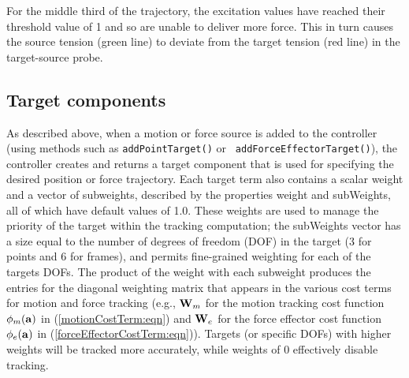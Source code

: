 For the middle third of the trajectory, the excitation values have reached
their threshold value of 1 and so are unable to deliver more force. This in
turn causes the source tension (green line) to deviate from the target tension
(red line) in the target-source probe.

%

\subsection{Target components}
\label{TargetComponents:sec}

As described above, when a motion or force source is added to the controller
(using methods such as {\tt addPointTarget()} or {\tt
addForceEffectorTarget()}), the controller creates and returns a target
component that is used for specifying the desired position or force
trajectory. Each target term also contains a scalar weight and a vector of
subweights, described by the properties {\sf weight} and {\sf subWeights}, all
of which have default values of 1.0. These weights are used to manage the
priority of the target within the tracking computation; the {\sf subWeights}
vector has a size equal to the number of degrees of freedom (DOF) in the target
(3 for points and 6 for frames), 
and permits fine-grained weighting for each of
the targets DOFs. The product of the weight with each subweight produces the
entries for the diagonal weighting matrix that appears in the various cost
terms for motion and force tracking (e.g., ${\bf W}_m$ for the motion tracking cost
function $\phi_m({\bf a})$ in (\ref{motionCostTerm:eqn}) and ${\bf W}_e$ for the force
effector cost function $\phi_e({\bf a})$ in (\ref{forceEffectorCostTerm:eqn})). Targets
(or specific DOFs) with higher weights will be tracked more accurately, while
weights of 0 effectively disable tracking.

